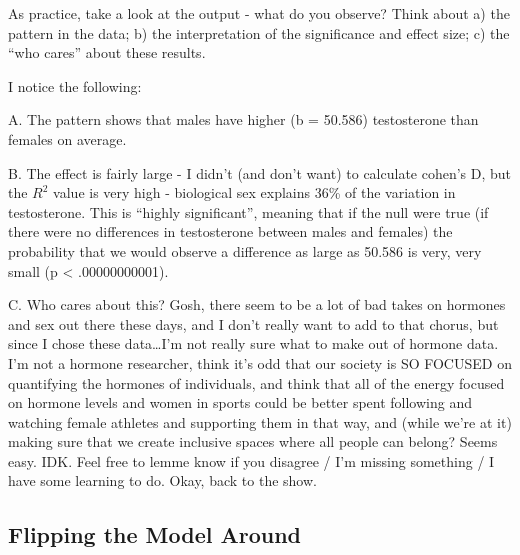 \documentclass[
  letterpaper,
  DIV=11,
  numbers=noendperiod,
  oneside]{scrreprt}
\begin{document}
As practice, take a look at the output - what do you observe? Think
about a) the pattern in the data; b) the interpretation of the
significance and effect size; c) the ``who cares'' about these results.

\begin{tcolorbox}[enhanced jigsaw, toptitle=1mm, toprule=.15mm, rightrule=.15mm, breakable, left=2mm, colbacktitle=quarto-callout-tip-color!10!white, colback=white, opacityback=0, coltitle=black, bottomtitle=1mm, opacitybacktitle=0.6, titlerule=0mm, leftrule=.75mm, arc=.35mm, bottomrule=.15mm, title=\textcolor{quarto-callout-tip-color}{\faLightbulb}\hspace{0.5em}{What Professor Observes (Think On Ur Own First?)}, colframe=quarto-callout-tip-color-frame]

I notice the following:

A. The pattern shows that males have higher (b = 50.586) testosterone
than females on average.

B. The effect is fairly large - I didn't (and don't want) to calculate
cohen's D, but the \(R^2\) value is very high - biological sex explains
36\% of the variation in testosterone. This is ``highly significant'',
meaning that if the null were true (if there were no differences in
testosterone between males and females) the probability that we would
observe a difference as large as 50.586 is very, very small (p
\textless{} .00000000001).

C. Who cares about this? Gosh, there seem to be a lot of bad takes on
hormones and sex out there these days, and I don't really want to add to
that chorus, but since I chose these data\ldots I'm not really sure what
to make out of hormone data. I'm not a hormone researcher, think it's
odd that our society is SO FOCUSED on quantifying the hormones of
individuals, and think that all of the energy focused on hormone levels
and women in sports could be better spent following and watching female
athletes and supporting them in that way, and (while we're at it) making
sure that we create inclusive spaces where all people can belong? Seems
easy. IDK. Feel free to lemme know if you disagree / I'm missing
something / I have some learning to do. Okay, back to the show.

\end{tcolorbox}

\subsection{Flipping the Model Around}\label{flipping-the-model-around}
\end{document}
